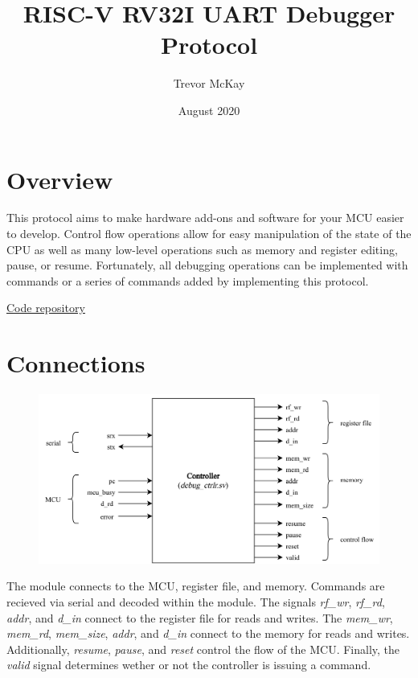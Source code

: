\documentclass[10pt,a4paper]{article}
\title{RISC-V RV32I UART Debugger Protocol}
\author{Trevor McKay}
\date{August 2020}
\begin{document}
\maketitle
\tableofcontents

\newpage

\section{Overview}

This protocol aims to make hardware add-ons and software for your MCU easier to develop. Control flow operations
allow for easy manipulation of the state of the CPU as well as many low-level operations such
as memory and register editing, pause, or resume. Fortunately, all debugging operations can be
implemented with commands or a series of commands added by implementing this
protocol.

\medskip
\noindent\underline{\href{https://github.com/trmckay/riscv-uart-debugger}{Code repository}}

\section{Connections}

\begin{figure}[H]
    \includegraphics[width=\textwidth]{blackbox}
\end{figure}
\medskip

The module connects to the MCU, register file, and memory. Commands are recieved via serial
and decoded within the module. The signals \emph{rf\_wr}, \emph{rf\_rd}, \emph{addr}, and
\emph{d\_in} connect to the register file for reads and writes. The \emph{mem\_wr},
\emph{mem\_rd}, \emph{mem\_size}, \emph{addr}, and \emph{d\_in} connect to the memory
for reads and writes. Additionally, \emph{resume}, \emph{pause}, and \emph{reset} control
the flow of the MCU\@. Finally, the \emph{valid} signal determines wether or not the controller
is issuing a command.
\end{document}
